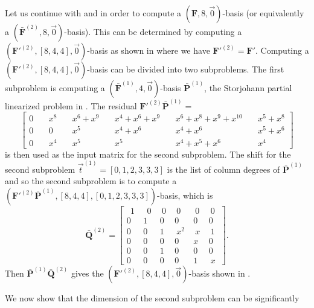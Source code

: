 \begin{example}
\label{exm:subproblems} Let us continue with 
and  in order to compute a
$\left(\mathbf{F},8,\vec{0}\right)$-basis (or equivalently a $(\bar{\mathbf{F}}^{\left(2\right)},8,\vec{0})$-basis).
This can be determined by computing a $(\mathbf{F}'^{\left(2\right)},[8,4,4],\vec{0})$-basis
as shown in  where we have
$\mathbf{F}'^{\left(2\right)}=\mathbf{F}'$. Computing a $(\mathbf{F}'^{\left(2\right)},[8,4,4],\vec{0})$-basis
can be divided into two subproblems. The first subproblem is computing
a $(\bar{\mathbf{F}}^{\left(1\right)},4,\vec{0})$-basis $\bar{\mathbf{P}}^{\left(1\right)}$,
the Storjohann partial linearized problem in .
The residual $\mathbf{F}'^{(2)}\bar{\mathbf{P}}^{(1)}=$ 
\[
\left[{\begin{array}{rcccccccccc}
0 & \  & x^{8} & \  & x^{6}+x^{9} & \  & x^{4}+x^{6}+x^{9} & \  & x^{6}+x^{8}+x^{9}+x^{10} & \  & x^{5}+x^{8}\\
0 &  & 0 &  & x^{5} &  & x^{4}+x^{6} &  & x^{4}+x^{6} &  & x^{5}+x^{6}\\
0 &  & x^{4} &  & x^{5} &  & x^{5} &  & x^{4}+x^{5}+x^{6} &  & x^{4}
\end{array}}\right]
\]
 is then used as the input matrix for the second subproblem. The shift
for the second subproblem $\vec{t}^{(1)}=[0,1,2,3,3,3]$ is the list
of column degrees of $\bar{\mathbf{P}}^{(1)}$ and so the second subproblem
is to compute a $(\mathbf{F}'^{(2)}\bar{\mathbf{P}}^{(1)},\left[8,4,4\right],[0,1,2,3,3,3])$-basis,
which is 
\begin{equation}
\bar{\mathbf{Q}}^{(2)}=\left[{\begin{array}{cccccc}
~~1~ & ~~0~ & ~0~ & ~0~ & ~0~ & ~0~\\
0 & 1 & 0 & 0 & 0 & 0\\
0 & 0 & 1 & ~x^{2}~ & ~x~ & ~1~\\
0 & 0 & 0 & 0 & x & 0\\
0 & 0 & 1 & 0 & 0 & 0\\
0 & 0 & 0 & 0 & 1 & ~x~
\end{array}}\right].\label{eq:Qbar2}
\end{equation}
 Then $\bar{\mathbf{P}}^{(1)}\bar{\mathbf{Q}}^{(2)}$ gives the $(\mathbf{F}'^{\left(2\right)},[8,4,4],\vec{0})$-basis
shown in . 
\end{example}
We now show that the dimension of the second subproblem can be significantly
